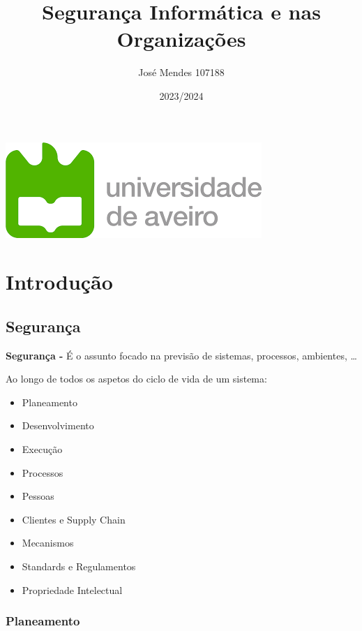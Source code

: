 \documentclass{article}
\title{Segurança Informática e nas Organizações}
\author{José Mendes 107188}
\date{2023/2024}
\begin{document}
\begin{titlepage}
    \maketitle
    \begin{center}
        \includegraphics[scale=0.4]{UA.png}
    \end{center}
    \thispagestyle{empty} %
\end{titlepage}

\pagebreak

\section{Introdução}

\subsection{Segurança}

\begin{flushleft}
  \textbf{Segurança -} É o assunto focado na previsão de sistemas, processos, ambientes, \dots

  Ao longo de todos os aspetos do ciclo de vida de um sistema:
  \begin{itemize}
    \item Planeamento
    \item Desenvolvimento
    \item Execução
    \item Processos
    \item Pessoas
    \item Clientes e Supply Chain
    \item Mecanismos
    \item Standards e Regulamentos
    \item Propriedade Intelectual
  \end{itemize}
\end{flushleft}

\subsubsection{Planeamento}
\end{document}
